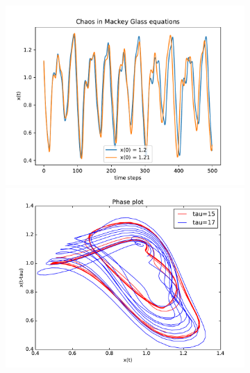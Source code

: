 \begin{figure}
    \centering
    \begin{subfigure}{.51\textwidth}
        \centering
        \includegraphics[width=\textwidth]{figures/mg_chaos_17.pdf}
        \includegraphics[width=\textwidth]{figures/17.pdf}
    \end{subfigure}
    \hspace{-6mm}
    \begin{subfigure}{.51\textwidth}
        \centering

\end{subfigure}
\end{figure}

